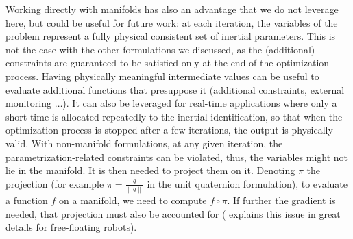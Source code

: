 



Working directly with manifolds has also an advantage that we do not leverage here, but could be useful for future work: at each iteration, the variables of the problem represent a fully physical consistent set of inertial parameters.
This is not the case with the other formulations we discussed, as the (additional) constraints are guaranteed to be satisfied only at the end of the optimization process. 
Having physically meaningful intermediate values can be useful to evaluate additional functions that presuppose it (additional constraints, external monitoring $\ldots$). 
It can also be leveraged for real-time applications where only a short time is allocated repeatedly to the inertial identification, so that when the optimization process is stopped after a few iterations, the output is physically valid.
With non-manifold formulations, at any given iteration, the parametrization-related constraints can be violated, thus, the variables might not lie in the manifold. It is then needed to project them on it. Denoting $\pi$ the projection (for example $\pi = \frac{q}{\left\|q\right\|}$ in the unit quaternion formulation), to evaluate a function $f$ on a manifold, we need to compute $f \circ \pi$. If further the gradient is needed, that projection must also be accounted for (\citep{bouyarmane2012humanoids} explains this issue in great details for free-floating robots).


